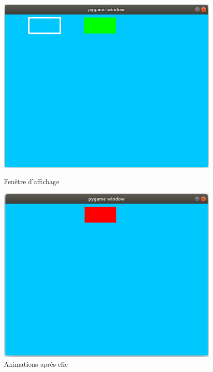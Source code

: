 \documentclass[a4paper]{article}
\begin{document}
\begin{figure}[h!]
   \begin{minipage}[l]{0.50\linewidth}
      \centering \includegraphics[scale=0.20]{img3.png}
      \caption{Fenêtre d'affichage}
 
   \end{minipage}\hfill
   \begin{minipage}[l]{0.50\linewidth}   
      \centering \includegraphics[scale=0.20]{img4.png}
      \caption{Animations après clic}
  
   \end{minipage}

   \end{figure}
\end{document}
